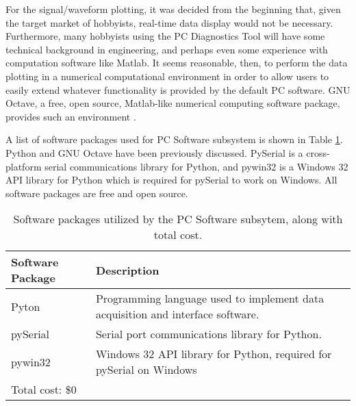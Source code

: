 For the signal/waveform plotting, it was decided from the beginning that, given the target 
market of hobbyists, real-time data display would not be necessary. Furthermore, many hobbyists 
using the PC Diagnostics Tool will have some technical background in engineering, and perhaps 
even some experience with computation software like Matlab. It seems reasonable, then, to 
perform the data plotting in a numerical computational environment in order to allow users to 
easily extend whatever functionality is provided by the default PC software. GNU Octave, a free, 
open source, Matlab-like numerical computing software package, provides such an 
environment \cite{web:octave}.

A list of software packages used for PC Software subsystem is shown in Table \ref{tab:software packages}. 
Python and GNU Octave have been previously discussed. PySerial is a cross-platform serial 
communications library for Python, and pywin32 is a Windows 32 API library for Python which is 
required for pySerial to work on Windows. All software packages are free and open source.


\begin{table}[h]
\caption[Software packages]{Software packages utilized by the PC Software subsytem, along with total cost.}
\begin{tabular}{l | p{8cm}}
	Software Package & Description \\ \hline
	Pyton & Programming language used to implement data acquisition and interface software. \\ 
	\hline
	pySerial & Serial port communications library for Python. \\
	\hline
	pywin32 & Windows 32 API library for Python, required for pySerial on Windows \\
	\hline
	\multicolumn{2}{l}{Total cost: \$0} \\
\end{tabular}
\label{tab:software packages}
\end{table}


